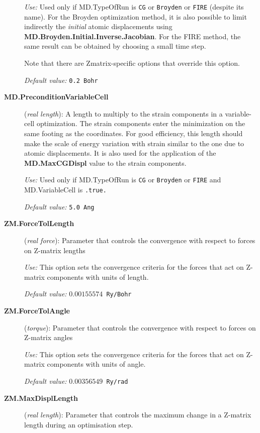 \begin{description}
\textit{Use:} Used only if MD.TypeOfRun is \texttt{CG} or \texttt{Broyden} or
\texttt{FIRE} (despite its name). For the Broyden optimization method, it is also
possible to limit indirectly the \textit{initial\/} atomic displacements
using \textbf{MD.Broyden.Initial.Inverse.Jacobian}. For the FIRE method,
the same result can be obtained by choosing a small time step.

Note that there are Zmatrix-specific options that override this option.

\textit{Default value:} \texttt{0.2 Bohr}


\item[\textbf{MD.PreconditionVariableCell}] (\textit{real length}):
   A length to multiply to the strain
  components in a variable-cell optimization.  The strain components
  enter the minimization on the same footing as the coordinates. For
  good efficiency, this length should make the scale of energy
  variation with strain similar to the one due to atomic
  displacements. It is also used for the application of the \textbf{MD.MaxCGDispl} value to the strain components.

\textit{Use:} Used only if MD.TypeOfRun is \texttt{CG} or \texttt{Broyden} or
\texttt{FIRE} and MD.VariableCell is \texttt{.true.}

\textit{Default value:} \texttt{5.0 Ang}

\item[\textbf{ZM.ForceTolLength}] (\textit{real force}):
   Parameter that
  controls the convergence with respect to forces on Z-matrix lengths

\textit{Use:} This option sets the convergence criteria for the forces that
act on Z-matrix components with units of length.

\textit{Default value:} \texttt{$0.00155574$ Ry/Bohr}

\item[\textbf{ZM.ForceTolAngle}] (\textit{torque}):
   Parameter that
  controls the convergence with respect to forces on Z-matrix angles

\textit{Use:} This option sets the convergence criteria for the forces that
act on Z-matrix components with units of angle.

\textit{Default value:} \texttt{$0.00356549$ Ry/rad}

\item[\textbf{ZM.MaxDisplLength}] (\textit{real length}):
   Parameter that
  controls the maximum change in a Z-matrix length during an
  optimisation step.


\end{description}
